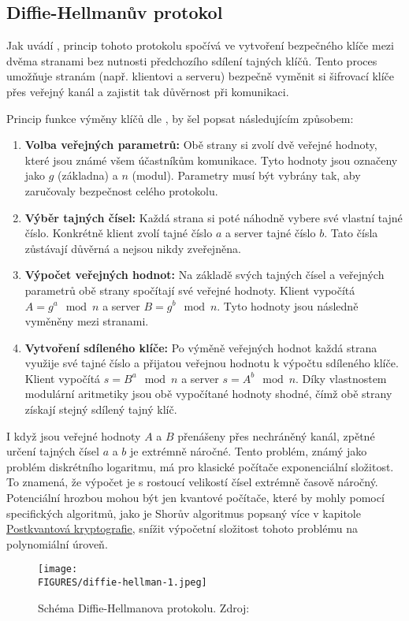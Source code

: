 \subsection{Diffie-Hellmanův protokol}

Jak uvádí \textcite{diffie1976}, princip tohoto protokolu spočívá ve vytvoření bezpečného klíče mezi dvěma stranami bez nutnosti předchozího sdílení tajných klíčů. Tento proces umožňuje stranám (např. klientovi a serveru) bezpečně vyměnit si šifrovací klíče přes veřejný kanál a zajistit tak důvěrnost při komunikaci.

Princip funkce výměny klíčů dle \textcite{diffie1976}, by šel popsat následujícím způsobem: 

\begin{enumerate}
    \item \textbf{Volba veřejných parametrů:} Obě strany si zvolí dvě veřejné hodnoty, které jsou známé všem účastníkům komunikace. Tyto hodnoty jsou označeny jako \(g\) (základna) a \(n\) (modul). Parametry musí být vybrány tak, aby zaručovaly bezpečnost celého protokolu.
    
    \item \textbf{Výběr tajných čísel:} Každá strana si poté náhodně vybere své vlastní tajné číslo. Konkrétně klient zvolí tajné číslo \(a\) a server tajné číslo \(b\). Tato čísla zůstávají důvěrná a nejsou nikdy zveřejněna.
    
    \item \textbf{Výpočet veřejných hodnot:} Na základě svých tajných čísel a veřejných parametrů obě strany spočítají své veřejné hodnoty. Klient vypočítá \(A = g^a \mod n\) a server \(B = g^b \mod n\). Tyto hodnoty jsou následně vyměněny mezi stranami.
    
    \item \textbf{Vytvoření sdíleného klíče:} Po výměně veřejných hodnot každá strana využije své tajné číslo a přijatou veřejnou hodnotu k výpočtu sdíleného klíče. Klient vypočítá \(s = B^a \mod n\) a server \(s = A^b \mod n\). Díky vlastnostem modulární aritmetiky jsou obě vypočítané hodnoty shodné, čímž obě strany získají stejný sdílený tajný klíč.
  \end{enumerate}

I když jsou veřejné hodnoty \(A\) a \(B\) přenášeny přes nechráněný kanál, zpětné určení tajných čísel \(a\) a \(b\) je extrémně náročné. Tento problém, známý jako problém diskrétního logaritmu, má pro klasické počítače exponenciální složitost. To znamená, že výpočet je s rostoucí velikostí čísel extrémně časově náročný. Potenciální hrozbou mohou být jen kvantové počítače, které by mohly pomocí specifických algoritmů, jako je Shorův algoritmus popsaný více v kapitole \hyperref[sec:postkvantova-kryptografie]{Postkvantová kryptografie}, snížit výpočetní složitost tohoto problému na polynomiální úroveň.

\begin{figure}[htbp]
    \centering
    \texttt{[image: \\FIGURES/diffie-hellman-1.jpeg]}
    \caption{Schéma Diffie-Hellmanova protokolu. Zdroj: \parencite{diffie-hellman-1}}
    \label{fig:diffie-hellman}
  \end{figure}

\newpage